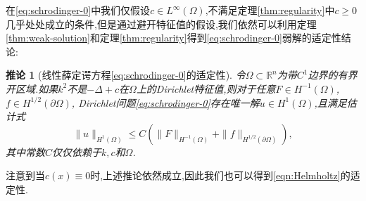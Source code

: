\documentclass[a4paper,punct=banjiao,twoside]{ctexrep}
\theoremstyle{plain}
\newtheorem{coro}[thm]{推论}
\theoremstyle{definition}
\theoremstyle{remark}
\begin{document}
在\eqref{eq:schrodinger-0}中我们仅假设$c\in L^{\infty}(\Omega)$,不满足定理\ref{thm:regularity}中$c\geq 0$几乎处处成立的条件,但是通过避开特征值的假设,我们依然可以利用定理\ref{thm:weak-solution}和定理\ref{thm:regularity}得到\eqref{eq:schrodinger-0}弱解的适定性结论:
\begin{coro}[线性薛定谔方程\eqref{eq:schrodinger-0}的适定性]\label{cor:Schrodinger-weak-solution}
令$\Omega\subset\mathbb{R}^n$为带$C^1$边界的有界开区域.如果$k^2$不是$-\Delta+c$在$\Omega$上的Dirichlet特征值,则对于任意$F\in H^{-1}(\Omega)$, $f\in H^{1/2}(\partial\Omega)$, Dirichlet问题\eqref{eq:schrodinger-0}存在唯一解$u\in H^1(\Omega)$,且满足估计式
\begin{equation}\label{eq:regularity-weak-solution}
\|u\|_{H^1(\Omega)} \leq C\left(\|F\|_{H^{-1}(\Omega)} +\|f\|_{H^{1/2}(\partial\Omega)} \right),
\end{equation}
其中常数$C$仅仅依赖于$k,c$和$\Omega$.
\end{coro}
注意到当$c(x)\equiv 0$时,上述推论依然成立,因此我们也可以得到\eqref{eqn:Helmholtz}的适定性.
\end{document}

